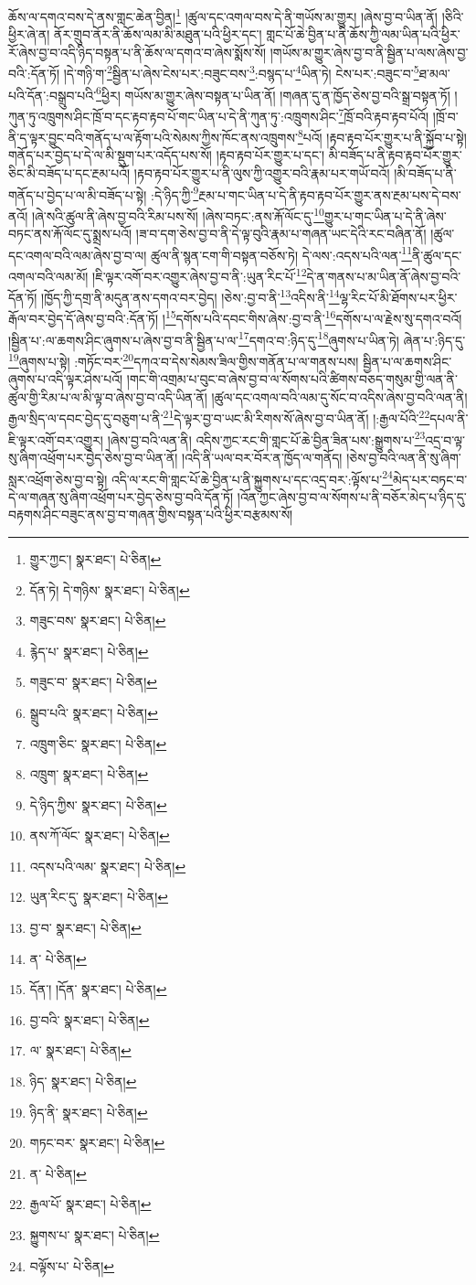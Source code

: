 ཆོས་ལ་དགའ་བས་དེ་ནས་གླང་ཆེན་བྱིན།\footnote{གྱུར་ཀྱང་།  སྣར་ཐང་།  པེ་ཅིན། } །ཚུལ་དང་འགལ་བས་དེ་ནི་གཡོས་མ་གྱུར། །ཞེས་བྱ་བ་ཡིན་ནོ། །ཅིའི་ཕྱིར་ཞེ་ན། ནོར་གྲུབ་ནོར་ནི་ཆོས་ལམ་མི་མཐུན་པའི་ཕྱིར་དང་། གླང་པོ་ཆེ་བྱིན་པ་ནི་ཆོས་ཀྱི་ལམ་ཡིན་པའི་ཕྱིར་རོ་ཞེས་བྱ་བ་འདི་ཉིད་བསྟན་པ་ནི་ཆོས་ལ་དགའ་བ་ཞེས་སྨོས་སོ། །གཡོས་མ་གྱུར་ཞེས་བྱ་བ་ནི་སྦྱིན་པ་ལས་ཞེས་བྱ་བའི་:དོན་ཏོ། །དེ་གཉི་ག་\footnote{དོན་ཏེ། དེ་གཉིས་  སྣར་ཐང་།  པེ་ཅིན། }སྦྱིན་པ་ཞེས་ངེས་པར་:བཟུང་བས་\footnote{གཟུང་བས་  སྣར་ཐང་།  པེ་ཅིན། }:བསྙད་པ་\footnote{རྙེད་པ་  སྣར་ཐང་།  པེ་ཅིན། }ཡིན་ཏེ། ངེས་པར་:བཟུང་བ་\footnote{གཟུང་བ་  སྣར་ཐང་།  པེ་ཅིན། }ཐ་མལ་པའི་དོན་:བསྒྲུབ་པའི་\footnote{སྒྲུབ་པའི་  སྣར་ཐང་།  པེ་ཅིན། }ཕྱིར། གཡོས་མ་གྱུར་ཞེས་བསྟན་པ་ཡིན་ནོ། །གཞན་དུ་ན་ཁྱོད་ཅེས་བྱ་བའི་སྒྲ་བསྟན་ཏོ། །ཀུན་ཏུ་འཁྲུགས་ཤིང་ཁྲོ་བ་དང་རྟབ་རྟབ་པོ་གང་ཡིན་པ་དེ་ནི་ཀུན་ཏུ་:འཁྲུགས་ཤིང་\footnote{འཁྲུག་ཅིང་  སྣར་ཐང་།  པེ་ཅིན། }ཁྲོ་བའི་རྟབ་རྟབ་པོའོ། །ཁྲོ་བ་ནི་ད་ལྟར་བྱུང་བའི་གནོད་པ་ལ་རྟོག་པའི་སེམས་ཀྱིས་ཁོང་ནས་འཁྲུགས་\footnote{འཁྲུག་  སྣར་ཐང་།  པེ་ཅིན། }པའོ། །རྟབ་རྟབ་པོར་གྱུར་པ་ནི་སྐྱོབ་པ་སྟེ། གནོད་པར་བྱེད་པ་དེ་ལ་མི་སྡུག་པར་འདོད་པས་སོ། །རྟབ་རྟབ་པོར་གྱུར་པ་དང་། མི་བཟོད་པ་ནི་རྟབ་རྟབ་པོར་གྱུར་ཅིང་མི་བཟོད་པ་དང་རྔམ་པའོ། །རྟབ་རྟབ་པོར་གྱུར་པ་ནི་ལུས་ཀྱི་འགྱུར་བའི་རྣམ་པར་གཡོ་བའོ། །མི་བཟོད་པ་ནི་གནོད་པ་བྱེད་པ་ལ་མི་བཟོད་པ་སྟེ། :དེ་ཉིད་ཀྱི་\footnote{དེ་ཉིད་ཀྱིས་  སྣར་ཐང་།  པེ་ཅིན། }རྔམ་པ་གང་ཡིན་པ་དེ་ནི་རྟབ་རྟབ་པོར་གྱུར་ནས་རྔམ་པས་དེ་བས་ནའོ། །ཞེ་སའི་ཚུལ་ནི་ཞེས་བྱ་བའི་རིམ་པས་སོ། །ཞེས་བཏང་:ནས་རྐོ་ལོང་དུ་\footnote{ནས་ཀོ་ལོང་  སྣར་ཐང་།  པེ་ཅིན། }གྱུར་པ་གང་ཡིན་པ་དེ་ནི་ཞེས་བཏང་ནས་རྐོ་ལོང་དུ་སྨྲས་པའོ། །ཟ་བ་དག་ཅེས་བྱ་བ་ནི་དེ་ལྟ་བུའི་རྣམ་པ་གཞན་ཡང་དེའི་རང་བཞིན་ནོ། །ཚུལ་དང་འགལ་བའི་ལམ་ཞེས་བྱ་བ་ལ། ཚུལ་ནི་སྙན་ངག་གི་བསྟན་བཅོས་ཏེ། དེ་ལས་:འདས་པའི་ལན་\footnote{འདས་པའི་ལམ་  སྣར་ཐང་།  པེ་ཅིན། }ནི་ཚུལ་དང་འགལ་བའི་ལམ་མོ། །ཇི་ལྟར་འགོ་བར་འགྱུར་ཞེས་བྱ་བ་ནི་:ཡུན་རིང་པོ་\footnote{ཡུན་རིང་དུ་  སྣར་ཐང་།  པེ་ཅིན། }དེ་ན་གནས་པ་མ་ཡིན་ནོ་ཞེས་བྱ་བའི་དོན་ཏོ། །ཁྱོད་ཀྱི་དགྲ་ནི་མདུན་ནས་དགའ་བར་བྱེད། །ཅེས་:བྱ་བ་ནི་\footnote{བྱ་བ་  སྣར་ཐང་།  པེ་ཅིན། }འདིས་ནི་\footnote{ན་  པེ་ཅིན། }ལྷ་རིང་པོ་མི་ཐོགས་པར་ཕྱིར་རྒོལ་བར་བྱེད་དོ་ཞེས་བྱ་བའི་:དོན་ཏོ། །\footnote{དོན་། །དོན་  སྣར་ཐང་།  པེ་ཅིན། }དགོས་པའི་དབང་གིས་ཞེས་:བྱ་བ་ནི་\footnote{བྱ་བའི་  སྣར་ཐང་།  པེ་ཅིན། }དགོས་པ་ལ་རྗེས་སུ་དགའ་བའོ། །སྦྱིན་པ་:ལ་ཆགས་ཤིང་ཞུགས་པ་ཞེས་བྱ་བ་ནི་སྦྱིན་པ་ལ་\footnote{ལ་  སྣར་ཐང་།  པེ་ཅིན། }དགའ་བ་:ཉིད་དུ་\footnote{ཉིད་  སྣར་ཐང་།  པེ་ཅིན། }ཞུགས་པ་ཡིན་ཏེ། ཞེན་པ་:ཉིད་དུ་\footnote{ཉིད་ནི་  སྣར་ཐང་།  པེ་ཅིན། }ཞུགས་པ་སྟེ། :གཏོང་བར་\footnote{གཏང་བར་  སྣར་ཐང་།  པེ་ཅིན། }དཀའ་བ་དེས་སེམས་ཟིལ་གྱིས་གནོན་པ་ལ་གནས་པས། སྦྱིན་པ་ལ་ཆགས་ཤིང་ཞུགས་པ་འདི་ལྟར་ཤེས་པའོ། །གང་གི་འགྲམ་པ་བུང་བ་ཞེས་བྱ་བ་ལ་སོགས་པའི་ཚིགས་བཅད་གསུམ་གྱི་ལན་ནི་ཚུལ་གྱི་རིམ་པ་ལ་མི་ལྟ་བ་ཞེས་བྱ་བ་འདི་ཡིན་ནོ། །ཚུལ་དང་འགལ་བའི་ལམ་དུ་སོང་བ་འདིས་ཞེས་བྱ་བའི་ལན་ནི། རྒྱལ་སྲིད་ལ་དབང་བྱེད་དུ་བཅུག་པ་ནི་\footnote{ན་  པེ་ཅིན། }དེ་ལྟར་བྱ་བ་ཡང་མི་རིགས་སོ་ཞེས་བྱ་བ་ཡིན་ནོ། །:རྒྱལ་པོའི་\footnote{རྒྱལ་པོ་  སྣར་ཐང་།  པེ་ཅིན། }དཔལ་ནི་ཇི་ལྟར་འགོ་བར་འགྱུར། །ཞེས་བྱ་བའི་ལན་ནི། འདིས་ཀྱང་རང་གི་གླང་པོ་ཆེ་བྱིན་ཟིན་པས་:སྒྱུགས་པ་\footnote{སྐྱུགས་པ་  སྣར་ཐང་།  པེ་ཅིན། }འདྲ་བ་ལྟ་སུ་ཞིག་འཕྲོག་པར་བྱེད་ཅེས་བྱ་བ་ཡིན་ནོ། །འདི་ནི་ཡལ་བར་བོར་ན་ཁྱོད་ལ་གནོད། །ཅེས་བྱ་བའི་ལན་ནི་སུ་ཞིག་སླར་འཕྲོག་ཅེས་བྱ་བ་སྟེ། འདི་ལ་རང་གི་གླང་པོ་ཆེ་བྱིན་པ་ནི་སྐྱུགས་པ་དང་འདྲ་བར་:ལྟོས་པ་\footnote{བལྟོས་པ་  པེ་ཅིན། }མེད་པར་བཏང་བ་དེ་ལ་གཞན་སུ་ཞིག་འཕྲོག་པར་བྱེད་ཅེས་བྱ་བའི་དོན་ཏོ། །འོན་ཀྱང་ཞེས་བྱ་བ་ལ་སོགས་པ་ནི་བཅོར་མེད་པ་ཉིད་དུ་བརྟགས་ཤིང་བཟུང་ནས་བྱ་བ་གཞན་གྱིས་བསྟན་པའི་ཕྱིར་བརྩམས་སོ། 